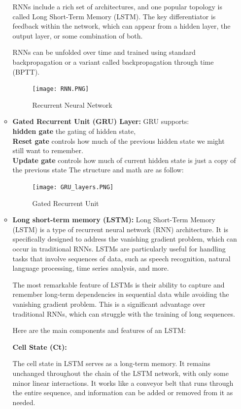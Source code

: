 \begin{itemize}
\begin{itemize}
    RNNs include a rich set of architectures, and one popular topology is called Long Short-Term Memory (LSTM). The key differentiator is feedback within the network, which can appear from a hidden layer, the output layer, or some combination of both.
    
    RNNs can be unfolded over time and trained using standard backpropagation or a variant called backpropagation through time (BPTT).  \cite{sherstinsky2020fundamentals}\\
    \begin{figure}[H]
        \centering\texttt{[image: RNN.PNG]}
        \caption{Recurrent Neural Network \cite{bfortuner_mlglossary}}
    \end{figure}
    \item \textbf{Gated Recurrent Unit (GRU) Layer: } GRU supports: \\
    \textbf{hidden gate} the gating of hidden state, \\
    \textbf{Reset gate} controls how much of the previous hidden state we might still want to remember.\\
    \textbf{Update gate} controls how much of current hidden state is just a copy of the previous state
    The structure and math are as follow:
    \begin{figure}[H]
        \centering\texttt{[image: GRU\_layers.PNG]}
        \caption{Gated Recurrent Unit \cite{bfortuner_mlglossary}}
    \end{figure}
    \item \textbf{Long short-term memory (LSTM): } Long Short-Term Memory (LSTM) is a type of recurrent neural network (RNN) architecture. It is specifically designed to address the vanishing gradient problem, which can occur in traditional RNNs. LSTMs are particularly useful for handling tasks that involve sequences of data, such as speech recognition, natural language processing, time series analysis, and more.

    The most remarkable feature of LSTMs is their ability to capture and remember long-term dependencies in sequential data while avoiding the vanishing gradient problem. This is a significant advantage over traditional RNNs, which can struggle with the training of long sequences. \cite{alzubaidi2021review} \cite{madhavan2017deep}
    
    Here are the main components and features of an LSTM:
    
    \textbf{Cell State (Ct):}
    
    The cell state in LSTM serves as a long-term memory. It remains unchanged throughout the chain of the LSTM network, with only some minor linear interactions. It works like a conveyor belt that runs through the entire sequence, and information can be added or removed from it as needed.\\
    

\end{itemize}
\end{itemize}
